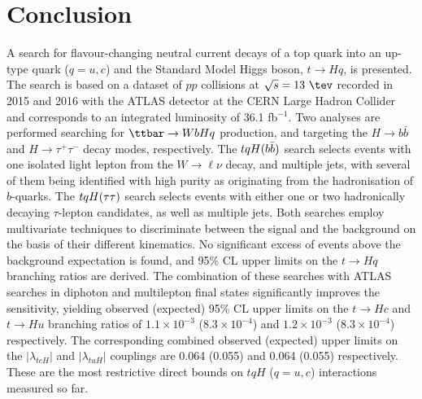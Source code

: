 \section{Conclusion}
\label{sec:conclusion}

A search for flavour-changing neutral current decays of a top quark into an up-type quark ($q=u, c$) and the Standard Model Higgs boson, $t\to Hq$, is presented. 
The search is based on a dataset of $pp$ collisions at $\sqrt{s}=13~\tev$ recorded in 2015 and 2016 with the ATLAS detector at the 
CERN Large Hadron Collider and corresponds to an integrated luminosity of 36.1 fb$^{-1}$.
Two analyses are performed searching for $\ttbar \to WbHq$ production, and targeting the $H \to b\bar{b}$ and $H \to \tau^+\tau^-$ decay modes, respectively.  
The $tqH(b\bar{b})$ search selects events with one isolated light lepton from the $W \to \ell\nu$ decay, and multiple jets, with several 
of them being identified with high purity as originating from the hadronisation of $b$-quarks. 
The $tqH(\tau\tau)$ search selects events with either one or two hadronically decaying $\tau$-lepton candidates, as well as multiple jets. 
Both searches employ multivariate techniques to discriminate between the signal and the background on the basis of their different kinematics. 
No significant excess of events above the background expectation is found, and 95\% CL upper limits on the $t\to Hq$ branching ratios are derived.
The combination of these searches with ATLAS searches in diphoton and multilepton final states significantly improves the sensitivity, 
yielding observed (expected) 95\% CL upper limits on the $t\to Hc$ and $t\to Hu$ branching ratios of $1.1 \times 10^{-3}$ ($8.3 \times 10^{-4}$) 
and $1.2 \times 10^{-3}$ ($8.3 \times 10^{-4}$) respectively.
The corresponding combined observed (expected) upper limits on the $|\lambda_{tcH}|$ and $|\lambda_{tuH}|$ couplings are 0.064 (0.055) and 0.064 (0.055) respectively. 
These are the most restrictive direct bounds on $tqH$ ($q=u,c$) interactions measured so far.
